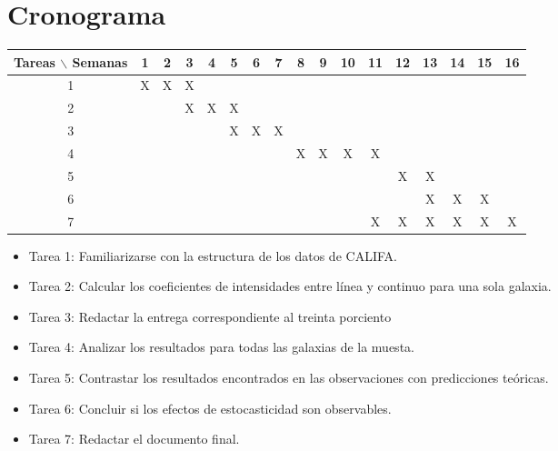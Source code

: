 \documentclass[12pt]{article}
\begin{document}



\section{Cronograma}

\begin{table}[htb]
	\begin{tabular}{|c|cccccccccccccccc| }
	\hline
	Tareas $\backslash$ Semanas & 1 & 2 & 3 & 4 & 5 & 6 & 7 & 8 & 9 & 10 & 11 & 12 & 13 & 14 & 15 & 16  \\
	\hline
	1 & X & X & X &   &   &   &   &   &   &   &   &   &   &   &   &   \\
	2 &   &   & X & X & X &   &   &   &   &   &   &   &   &   &   &   \\
	3 &   &   &   &   & X & X & X &   &   &   &   &   &   &   &   &   \\
	4 &   &   &   &   &   &   &   & X & X & X & X &   &   &   &   &   \\
	5 &   &   &   &   &   &   &   &   &   &   &   & X & X &   &   &   \\
	6 &   &   &   &   &   &   &   &   &   &   &   &   & X & X & X &   \\
	7 &   &   &   &   &   &   &   &   &   &   & X & X & X & X & X & X \\
	\hline
	\end{tabular}
\end{table}
\vspace{1mm}

\begin{itemize}
    \item Tarea 1: Familiarizarse con la estructura de los datos de
      CALIFA. 
    \item Tarea 2: Calcular los coeficientes de intensidades entre
      l\'inea y continuo para una sola galaxia.
    \item Tarea 3: Redactar la entrega correspondiente al treinta
      porciento
    \item Tarea 4: Analizar los resultados para todas las galaxias de
      la muesta. 
    \item Tarea 5: Contrastar los resultados encontrados en las
      observaciones con predicciones te\'oricas.
    \item Tarea 6: Concluir si los efectos de estocasticidad son observables. 
    \item Tarea 7: Redactar el documento final.
\end{itemize}
\end{document}
